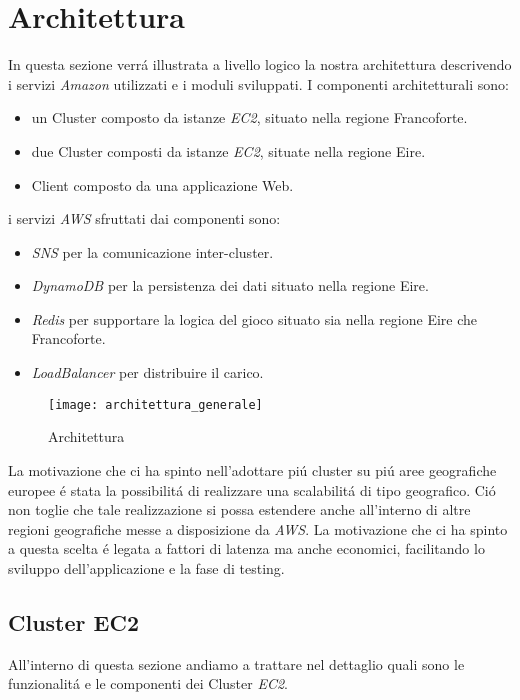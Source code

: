 \documentclass{sig-alternate-05-2015}
\begin{document}
\section{Architettura}


In questa sezione verr\'a illustrata a livello logico la nostra architettura descrivendo i servizi \textit{Amazon} utilizzati e i moduli sviluppati.
I componenti architetturali sono:
\begin{itemize}
\item un Cluster composto da istanze \textit{EC2}, situato nella regione Francoforte.
\item due Cluster composti da istanze \textit{EC2}, situate nella regione Eire.
\item Client composto da una applicazione Web.
\end{itemize}

i servizi \textit{AWS} sfruttati dai componenti sono:
\begin{itemize}
\item \textit{SNS} per la comunicazione inter-cluster.
\item \textit{DynamoDB} per la persistenza dei dati situato nella regione Eire.
\item \textit{Redis} per supportare la logica del gioco situato sia nella regione Eire che Francoforte.
\item \textit{LoadBalancer} per distribuire il carico. 
\end{itemize}

\begin{figure}\centering
 \texttt{[image: architettura\_generale]} 
 \caption{Architettura} \label{nome} 
 \end{figure}
 
La motivazione che ci ha spinto nell'adottare pi\'u cluster su pi\'u aree geografiche europee \'e stata la possibilit\'a di realizzare una scalabilit\'a di tipo geografico.
Ci\'o non toglie che tale realizzazione si possa estendere anche all'interno di altre regioni geografiche messe a disposizione da \textit{AWS}. La motivazione che ci ha spinto a questa scelta \'e legata a fattori di latenza ma anche economici, facilitando lo sviluppo dell'applicazione e la fase di testing.




\subsection{Cluster EC2}


All'interno di questa sezione andiamo a trattare nel dettaglio quali sono le funzionalit\'a e le componenti dei Cluster \textit{EC2}.
\end{document}
